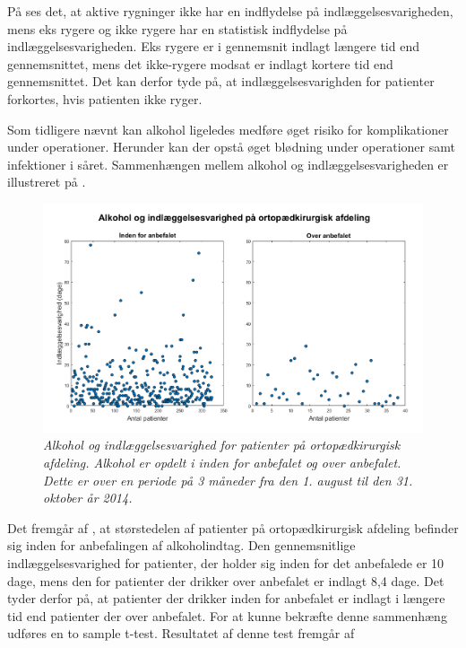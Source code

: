 \noindent
På  ses det, at aktive rygninger ikke har en indflydelse på indlæggelsesvarigheden, mens eks rygere og ikke rygere har en statistisk indflydelse på indlæggelsesvarigheden. Eks rygere er i gennemsnit indlagt længere tid end gennemsnittet, mens det ikke-rygere modsat er indlagt kortere tid end gennemsnittet. Det kan derfor tyde på, at indlæggelsesvarighden for patienter forkortes, hvis patienten ikke ryger. 

Som tidligere nævnt kan alkohol ligeledes medføre øget risiko for komplikationer under operationer. Herunder kan der opstå øget blødning under operationer samt infektioner i såret.\cite{Nordjylland2014} Sammenhængen mellem alkohol og indlæggelsesvarigheden er illustreret på  . 


\begin{figure}[H]
	\centering
	\includegraphics[scale=0.4]{figures/alkohologindlaeg}
	\caption{\textit{Alkohol og indlæggelsesvarighed for patienter på ortopædkirurgisk afdeling. Alkohol er opdelt i inden for anbefalet og over anbefalet. Dette er over en periode på 3 måneder fra den 1. august til den 31. oktober år 2014. }}
	\label{alkohologindlaeggelse}
\end{figure}

\noindent
Det fremgår af , at størstedelen af patienter på ortopædkirurgisk afdeling befinder sig inden for anbefalingen af alkoholindtag. Den gennemsnitlige indlæggelsesvarighed for patienter, der holder sig inden for det anbefalede er 10 dage, mens den for patienter der drikker over anbefalet er indlagt 8,4 dage. Det tyder derfor på, at patienter der drikker inden for anbefalet er indlagt i længere tid end patienter der over anbefalet. 
For at kunne bekræfte denne sammenhæng udføres en to sample t-test. Resultatet af denne test fremgår af 


